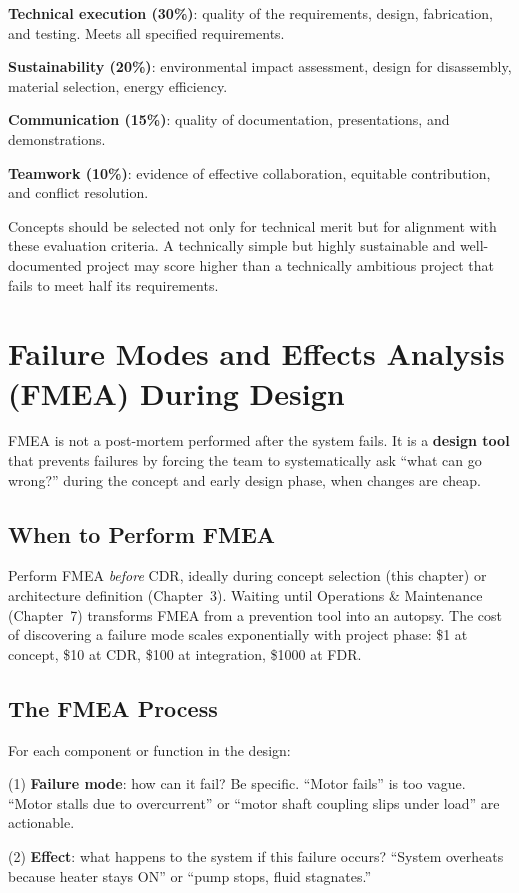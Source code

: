 \documentclass[11pt,letterpaper,twoside,openany]{book}
\begin{document}
\textbf{Technical execution (30\%)}: quality of the requirements, design, fabrication, and testing. Meets all specified requirements.

\textbf{Sustainability (20\%)}: environmental impact assessment, design for disassembly, material selection, energy efficiency.

\textbf{Communication (15\%)}: quality of documentation, presentations, and demonstrations.

\textbf{Teamwork (10\%)}: evidence of effective collaboration, equitable contribution, and conflict resolution.

Concepts should be selected not only for technical merit but for alignment with these evaluation criteria. A technically simple but highly sustainable and well-documented project may score higher than a technically ambitious project that fails to meet half its requirements.
\section{Failure Modes and Effects Analysis (FMEA) During Design}
FMEA is not a post-mortem performed after the system fails. It is a \textbf{design tool} that prevents failures by forcing the team to systematically ask ``what can go wrong?'' during the concept and early design phase, when changes are cheap.

\subsection{When to Perform FMEA}
Perform FMEA \emph{before} CDR, ideally during concept selection (this chapter) or architecture definition (Chapter~3). Waiting until Operations \& Maintenance (Chapter~7) transforms FMEA from a prevention tool into an autopsy. The cost of discovering a failure mode scales exponentially with project phase: \$1 at concept, \$10 at CDR, \$100 at integration, \$1000 at FDR.

\subsection{The FMEA Process}
For each component or function in the design:

(1) \textbf{Failure mode}: how can it fail? Be specific. ``Motor fails'' is too vague. ``Motor stalls due to overcurrent'' or ``motor shaft coupling slips under load'' are actionable.

(2) \textbf{Effect}: what happens to the system if this failure occurs? ``System overheats because heater stays ON'' or ``pump stops, fluid stagnates.''
\end{document}
